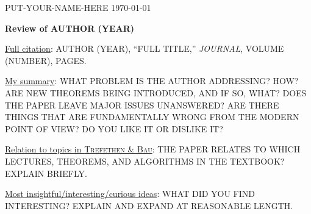 \documentclass[12pt]{amsart}
\newcommand{\textbook}{\textsc{Trefethen \& Bau}}
\begin{document}
\scriptsize \noindent PUT-YOUR-NAME-HERE \hfill \today
\normalsize
\thispagestyle{empty}



\bigskip
\large\centerline{\textbf{Review of AUTHOR (YEAR)}}
\normalsize
\bigskip

\noindent \underline{Full citation}:  AUTHOR (YEAR), ``FULL TITLE,'' \emph{JOURNAL}, VOLUME (NUMBER), PAGES.

\bigskip

\noindent \underline{My summary}:  WHAT PROBLEM IS THE AUTHOR ADDRESSING?  HOW?  ARE NEW THEOREMS BEING INTRODUCED, AND IF SO, WHAT?  DOES THE PAPER LEAVE MAJOR ISSUES UNANSWERED?  ARE THERE THINGS THAT ARE FUNDAMENTALLY WRONG FROM THE MODERN POINT OF VIEW?  DO YOU LIKE IT OR DISLIKE IT?
\bigskip

\noindent \underline{Relation to topics in \textbook}:  THE PAPER RELATES TO WHICH LECTURES, THEOREMS, AND ALGORITHMS IN THE TEXTBOOK?  EXPLAIN BRIEFLY.
\bigskip

\noindent \underline{Most insightful/interesting/curious ideas}:  WHAT DID YOU FIND INTERESTING?  EXPLAIN AND EXPAND AT REASONABLE LENGTH.
\bigskip
\end{document}
